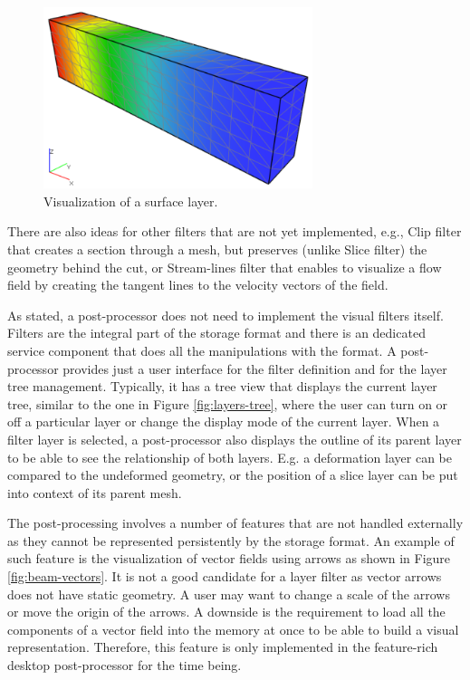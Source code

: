 \begin{itemize}
    \begin{figure}[H]
        \centering
        \includegraphics[width=0.7\textwidth]{figures/chapter-data-management/beam-surface-layer}
        \decoRule
        \caption{Visualization of a surface layer.}
        \label{fig:beam-surface-layer}
    \end{figure}

\end{itemize}

There are also ideas for other filters that are not yet implemented, e.g., Clip filter that creates a section through a mesh, but preserves (unlike Slice filter) the geometry behind the cut, or Stream-lines filter that enables to visualize a flow field by creating the tangent lines to the velocity vectors of the field.

As stated, a post-processor does not need to implement the visual filters itself. Filters are the integral part of the storage format and there is an dedicated service component that does all the manipulations with the format. A post-processor provides just a user interface for the filter definition and for the layer tree management. Typically, it has a tree view that displays the current layer tree, similar to the one in Figure \ref{fig:layers-tree}, where the user can turn on or off a particular layer or change the display mode of the current layer. When a filter layer is selected, a post-processor also displays the outline of its parent layer to be able to see the relationship of both layers. E.g. a deformation layer can be compared to the undeformed geometry, or the position of a slice layer can be put into context of its parent mesh.

The post-processing involves a number of features that are not handled externally as they cannot be represented persistently by the storage format. An example of such feature is the visualization of vector fields using arrows as shown in Figure \ref{fig:beam-vectors}. It is not a good candidate for a layer filter as vector arrows does not have static geometry. A user may want to change a scale of the arrows or move the origin of the arrows. A downside is the requirement to load all the components of a vector field into the memory at once to be able to build a visual representation. Therefore, this feature is only implemented in the feature-rich desktop post-processor for the time being.

